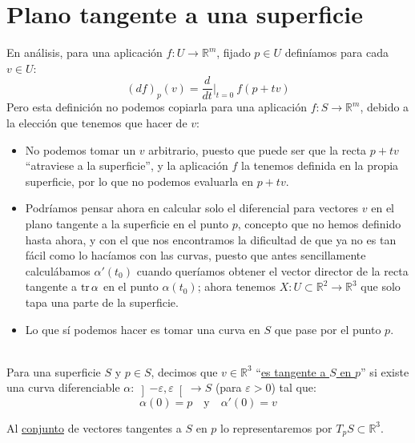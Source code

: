 \section{Plano tangente a una superficie}
\noindent
En análisis, para una aplicación $f:U\to \mathbb{R}^m$, fijado $p\in U$ definíamos para cada $v\in U$:
\begin{equation*}
    (df)_p(v) = \frac{d}{dt}\big|_{t=0}\ f(p+tv)
\end{equation*}
Pero esta definición no podemos copiarla para una aplicación $f:S\to \mathbb{R}^m$, debido a la elección que tenemos que hacer de $v$:
\begin{itemize}
    \item No podemos tomar un $v$ arbitrario, puesto que puede ser que la recta $p+tv$ ``atraviese a la superficie'', y la aplicación $f$ la tenemos definida en la propia superficie, por lo que no podemos evaluarla en $p+tv$.
    \item Podríamos pensar ahora en calcular solo el diferencial para vectores $v$ en el plano tangente a la superficie en el punto $p$, concepto que no hemos definido hasta ahora, y con el que nos encontramos la dificultad de que ya no es tan fácil como lo hacíamos con las curvas, puesto que antes sencillamente calculábamos $\alpha'(t_0)$ cuando queríamos obtener el vector director de la recta tangente a $\operatorname{tr}\alpha$ en el punto $\alpha(t_0)$; ahora tenemos $X:U\subset\mathbb{R}^2\to \mathbb{R}^3$ que solo tapa una parte de la superficie.
    \item Lo que sí podemos hacer es tomar una curva en $S$ que pase por el punto $p$.
\end{itemize}

\begin{definicion}~\\
    \noindent
    Para una superficie $S$ y $p\in S$, decimos que $v\in \mathbb{R}^3$ ``\underline{es tangente a $S$ en $p$}'' si existe una curva diferenciable $\alpha:\left]-\varepsilon,\varepsilon\right[\to S$ (para $\varepsilon>0$) tal que: 
    \begin{equation*}
        \alpha(0) = p \quad \text{y}\quad  \alpha'(0) = v
    \end{equation*}

    \noindent
    Al \underline{conjunto} de vectores tangentes a $S$ en $p$ lo representaremos por $T_pS\subset \mathbb{R}^3$.
\end{definicion}~\\

